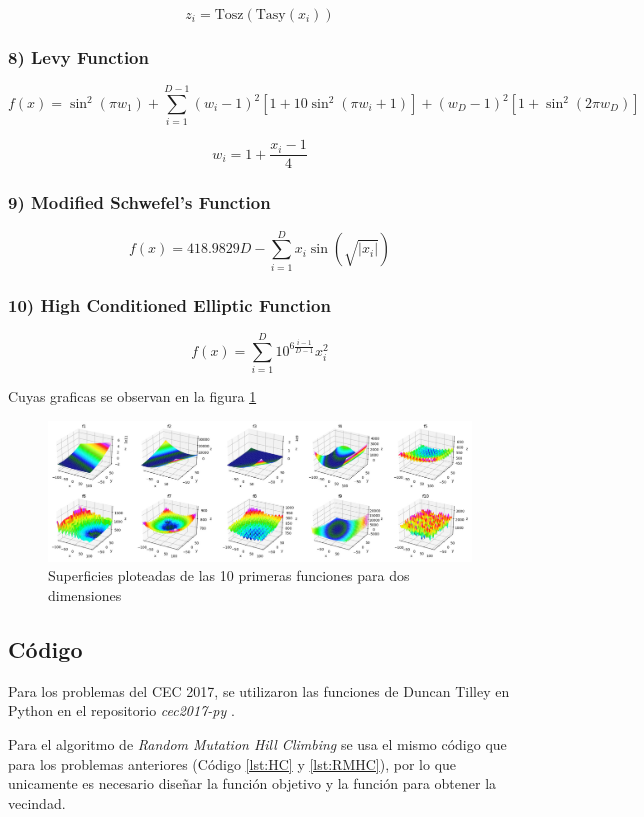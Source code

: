 \documentclass[12pt,twoside]{article}
\begin{document}
	\[
	z_i = \text{Tosz}(\text{Tasy}(x_i))
	\]
	
	\subsubsection*{8) Levy Function}
	\[
	f(x) = \sin^2(\pi w_1) + \sum_{i=1}^{D-1} (w_i - 1)^2 \left[ 1 + 10\sin^2(\pi w_i + 1) \right] + (w_D - 1)^2 \left[ 1 + \sin^2(2\pi w_D) \right]
	\]
	
	\[
	w_i = 1 + \frac{x_i - 1}{4}
	\]
	
	\subsubsection*{9) Modified Schwefel's Function}
	\[
	f(x) = 418.9829 D - \sum_{i=1}^{D} x_i \sin(\sqrt{|x_i|})
	\]
	
	\subsubsection*{10) High Conditioned Elliptic Function}
	\[
	f(x) = \sum_{i=1}^{D} 10^{6 \frac{i-1}{D-1}} x_i^2
	\]
	
	Cuyas graficas se observan en la figura \ref{fig:cec}
	
	\begin{figure}[H]
		\centering
		\includegraphics[width=1\linewidth]{img/cec}
		\caption{Superficies ploteadas de las 10 primeras funciones para dos dimensiones \cite{plot}}
		\label{fig:cec}
	\end{figure}
	
\subsection{Código}

Para los problemas del CEC 2017, se utilizaron las funciones de Duncan Tilley en Python en el repositorio \textit{cec2017-py} \cite{git}.

Para el algoritmo de \textit{Random Mutation Hill Climbing} se usa el mismo código que para los problemas anteriores (Código \ref{lst:HC} y \ref{lst:RMHC}), por lo que unicamente es necesario diseñar la función objetivo y la función para obtener la vecindad.
\end{document}
